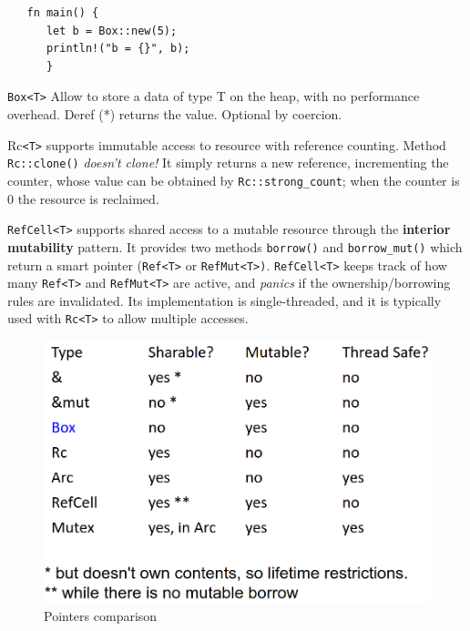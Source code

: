 \begin{lstlisting}
   fn main() {
      let b = Box::new(5);
      println!("b = {}", b);
      }
\end{lstlisting}

\lstinline|Box<T>| Allow to store a data of type T on the heap, with no performance overhead.
Deref (*) returns the value. Optional by coercion.

Rc\lstinline|<T>| supports immutable access to resource with
reference counting.
Method \lstinline|Rc::clone()| \emph{doesn’t clone!}
It simply returns a new reference, incrementing the counter,
whose value can be obtained by \lstinline|Rc::strong_count|;
when the counter is 0 the resource is reclaimed.


\lstinline|RefCell<T>| supports shared access to a mutable
resource through the \textbf{interior mutability} pattern.
It provides two methods \lstinline|borrow()| and \lstinline|borrow_mut()| which
return a smart pointer (\lstinline|Ref<T>| or \lstinline|RefMut<T>)|.
\lstinline|RefCell<T>| keeps track of how many \lstinline|Ref<T>| and
\lstinline|RefMut<T>| are active, and \textit{panics} if the
ownership/borrowing rules are invalidated.
Its implementation is single-threaded, and it is typically used with \lstinline|Rc<T>| to allow multiple accesses.

\begin{figure}[htbp]
   \centering
   \includegraphics{images/smartpointers.png}
   \caption{Pointers comparison}
   \label{fig:smartpointers}
\end{figure}

